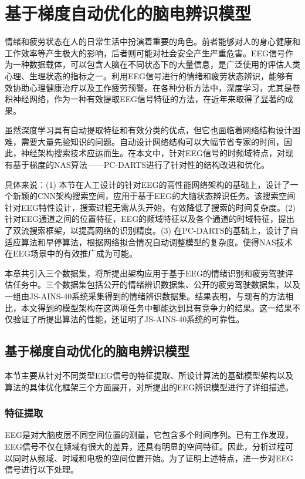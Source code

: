 
\chapter{基于梯度自动优化的脑电辨识模型}
情绪和疲劳状态在人的日常生活中扮演着重要的角色。前者能够对人的身心健康和工作效率等产生极大的影响，后者则可能对社会安全产生严重危害。EEG信号作为一种数据载体，可以包含人脑在不同状态下的大量信息，是广泛使用的评估人类心理、生理状态的指标之一。利用EEG信号进行的情绪和疲劳状态辨识，能够有效协助心理健康治疗以及工作疲劳预警。在各种分析方法中，深度学习，尤其是卷积神经网络，作为一种有效提取EEG信号特征的方法，在近年来取得了显著的成果。

虽然深度学习具有自动提取特征和有效分类的优点，但它也面临着网络结构设计困难，需要大量先验知识的问题。自动设计网络结构可以大幅节省专家的时间，因此，神经架构搜索技术应运而生。在本文中，针对EEG信号的时频域特点，对现有基于梯度的NAS算法——PC-DARTS\cite{3-7}进行了针对性的结构改进和优化。

具体来说：(1) 本节在人工设计的针对EEG的高性能网络架构的基础上，设计了一个新颖的CNN架构搜索空间，应用于基于EEG的大脑状态辨识任务。该搜索空间针对EEG特性设计，搜索过程无需从头开始，有效降低了搜索的时间复杂度。(2) 针对EEG通道之间的位置特征，EEG的频域特征以及各个通道的时域特征，提出了双流搜索框架，以提高网络的识别精度。(3) 在PC-DARTS的基础上，设计了自适应算法和早停算法，根据网络拟合情况自动调整模型的复杂度。使得NAS技术在EEG场景中的有效推广成为可能。

本章共引入三个数据集，将所提出架构应用于基于EEG的情绪识别和疲劳驾驶评估任务中。三个数据集包括公开的情绪辨识数据集、公开的疲劳驾驶数据集，以及一组由JS-AINS-40系统采集得到的情绪辨识数据集。结果表明，与现有的方法相比，本文得到的模型架构在这两项任务中都能达到具有竞争力的结果。这一结果不仅验证了所提出算法的性能，还证明了JS-AINS-40系统的可靠性。

\section{基于梯度自动优化的脑电辨识模型}
本节主要从针对不同类型EEG信号的特征提取、所设计算法的基础模型架构以及算法的具体优化框架三个方面展开，对所提出的EEG辨识模型进行了详细描述。
\subsection{特征提取}
EEG是对大脑皮层不同空间位置的测量，它包含多个时间序列。已有工作发现\cite{3-1}，EEG信号不仅在频域有很大的差异，还具有明显的空间特征。因此，分析过程可以同时从频域、时域和电极的空间位置开始。为了证明上述特点，进一步对EEG信号进行以下处理。

